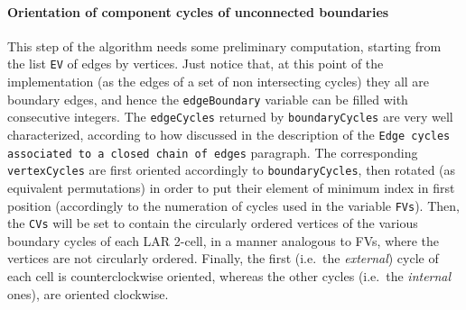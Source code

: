 \documentclass[11pt,oneside]{article}	%
\begin{document}
\paragraph{Orientation of component cycles of unconnected boundaries}

This step of the algorithm needs some preliminary computation, starting from the list \texttt{EV} of edges by vertices. Just notice that, at this point of the implementation (as the edges of a set of non intersecting cycles) they all are boundary edges, and hence the \texttt{edgeBoundary} variable can be filled with consecutive integers. The \texttt{edgeCycles} returned by \texttt{boundaryCycles} are very well characterized, according to how discussed in the description of the \texttt{Edge cycles associated to a closed chain of edges} paragraph.
The corresponding \texttt{vertexCycles} are first oriented accordingly to \texttt{boundaryCycles}, then rotated (as equivalent permutations) in order to put their element of minimum index in first position (accordingly to the numeration of cycles used in the variable \texttt{FVs}). Then, the \texttt{CVs} will be set to contain the circularly ordered vertices of the various boundary cycles of each LAR 2-cell, in a manner analogous to FVs, where the vertices are not circularly ordered. Finally, the first (i.e.~the \emph{external}) cycle of each cell is counterclockwise oriented, whereas the other cycles (i.e.~the \emph{internal} ones), are oriented clockwise.
\end{document}
